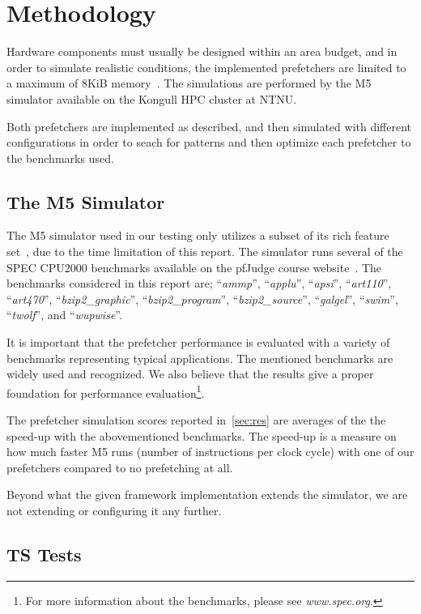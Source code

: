 \section{Methodology}

Hardware components must usually be designed within an area budget, and in order
to simulate realistic conditions, the implemented prefetchers are limited to a
maximum of 8KiB memory~\cite{guidelines}. The simulations are performed by the
M5 simulator available on the Kongull HPC cluster at NTNU.

Both prefetchers are implemented as described, and then simulated with different
configurations in order to seach for patterns and then optimize each prefetcher
to the benchmarks used.

\subsection{The M5 Simulator}

The M5 simulator used in our testing only utilizes a subset of its rich feature
set~\cite{user_doc}, due to the time limitation of this report. The simulator
runs several of the SPEC CPU2000 benchmarks available on the pfJudge course
website~\cite{guidelines}. The benchmarks considered in this report are;
``\emph{ammp}'', ``\emph{applu}'', ``\emph{apsi}'', ``\emph{art110}'',
``\emph{art470}'', ``\emph{bzip2\_graphic}'', ``\emph{bzip2\_program}'',
``\emph{bzip2\_source}'', ``\emph{galgel}'', ``\emph{swim}'', ``\emph{twolf}'',
and ``\emph{wupwise}''.

It is important that the prefetcher performance is evaluated with a variety of
benchmarks representing typical applications. The mentioned benchmarks are
widely used and recognized. We also believe that the results give a proper
foundation for performance evaluation\footnote{For more information about the
benchmarks, please see \emph{www.spec.org}.}.

The prefetcher simulation scores reported in~\ref{sec:res} are averages of the
the speed-up with the abovementioned benchmarks. The speed-up is a measure on how
much faster M5 runs (number of instructions per clock cycle) with one of our
prefetchers compared to no prefetching at all.

Beyond what the given framework implementation extends the simulator, we are not
extending or configuring it any further.


\subsection{TS Tests}

